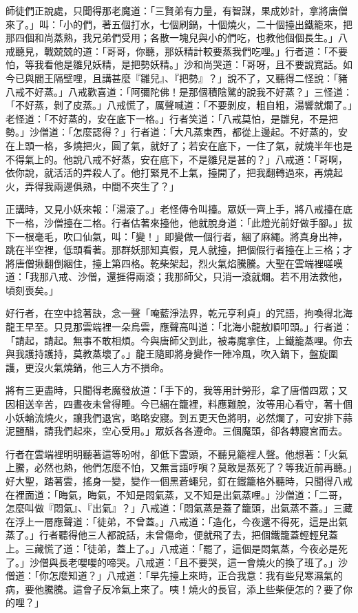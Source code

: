 師徒們正說處，只聞得那老魔道：「三賢弟有力量，有智謀，果成妙計，拿將唐僧來了。」叫：「小的們，著五個打水，七個刷鍋，十個燒火，二十個擡出鐵籠來，把那四個和尚蒸熟，我兄弟們受用；各散一塊兒與小的們吃，也教他個個長生。」八戒聽見，戰兢兢的道：「哥哥，你聽，那妖精計較要蒸我們吃哩。」行者道：「不要怕，等我看他是雛兒妖精，是把勢妖精。」沙和尚哭道：「哥呀，且不要說寬話。如今已與閻王隔壁哩，且講甚麼『雛兒』、『把勢』？」說不了，又聽得二怪說：「豬八戒不好蒸。」八戒歡喜道：「阿彌陀佛！是那個積陰騭的說我不好蒸？」三怪道：「不好蒸，剝了皮蒸。」八戒慌了，厲聲喊道：「不要剝皮，粗自粗，湯響就爛了。」老怪道：「不好蒸的，安在底下一格。」行者笑道：「八戒莫怕，是雛兒，不是把勢。」沙僧道：「怎麼認得？」行者道：「大凡蒸東西，都從上邊起。不好蒸的，安在上頭一格，多燒把火，圓了氣，就好了；若安在底下，一住了氣，就燒半年也是不得氣上的。他說八戒不好蒸，安在底下，不是雛兒是甚的？」八戒道：「哥啊，依你說，就活活的弄殺人了。他打緊見不上氣，擡開了，把我翻轉過來，再燒起火，弄得我兩邊俱熟，中間不夾生了？」

正講時，又見小妖來報：「湯滾了。」老怪傳令叫擡。眾妖一齊上手，將八戒擡在底下一格，沙僧擡在二格。行者估著來擡他，他就脫身道：「此燈光前好做手腳。」拔下一根毫毛，吹口仙氣，叫：「變！」即變做一個行者，綑了麻繩。將真身出神，跳在半空裡，低頭看著。那群妖那知真假，見人就擡，把個假行者擡在上三格；才將唐僧揪翻倒綑住，擡上第四格。乾柴架起，烈火氣焰騰騰。大聖在雲端裡嗟嘆道：「我那八戒、沙僧，還捱得兩滾；我那師父，只消一滾就爛。若不用法救他，頃刻喪矣。」

好行者，在空中捻著訣，念一聲「唵藍淨法界，乾元亨利貞」的咒語，拘喚得北海龍王早至。只見那雲端裡一朵烏雲，應聲高叫道：「北海小龍敖順叩頭。」行者道：「請起，請起。無事不敢相煩。今與唐師父到此，被毒魔拿住，上鐵籠蒸哩。你去與我護持護持，莫教蒸壞了。」龍王隨即將身變作一陣冷風，吹入鍋下，盤旋圍護，更沒火氣燒鍋，他三人方不損命。

將有三更盡時，只聞得老魔發放道：「手下的，我等用計勞形，拿了唐僧四眾；又因相送辛苦，四晝夜未曾得睡。今已綑在籠裡，料應難脫，汝等用心看守，著十個小妖輪流燒火，讓我們退宮，略略安寢。到五更天色將明，必然爛了，可安排下蒜泥鹽醋，請我們起來，空心受用。」眾妖各各遵命。三個魔頭，卻各轉寢宮而去。

行者在雲端裡明明聽著這等吩咐，卻低下雲頭，不聽見籠裡人聲。他想著：「火氣上騰，必然也熱，他們怎麼不怕，又無言語哼嗔？莫敢是蒸死了？等我近前再聽。」好大聖，踏著雲，搖身一變，變作一個黑蒼蠅兒，釘在鐵籠格外聽時，只聞得八戒在裡面道：「晦氣，晦氣，不知是悶氣蒸，又不知是出氣蒸哩。」沙僧道：「二哥，怎麼叫做『悶氣』、『出氣』？」八戒道：「悶氣蒸是蓋了籠頭，出氣蒸不蓋。」三藏在浮上一層應聲道：「徒弟，不曾蓋。」八戒道：「造化，今夜還不得死，這是出氣蒸了。」行者聽得他三人都說話，未曾傷命，便就飛了去，把個鐵籠蓋輕輕兒蓋上。三藏慌了道：「徒弟，蓋上了。」八戒道：「罷了，這個是悶氣蒸，今夜必是死了。」沙僧與長老嚶嚶的啼哭。八戒道：「且不要哭，這一會燒火的換了班了。」沙僧道：「你怎麼知道？」八戒道：「早先擡上來時，正合我意：我有些兒寒濕氣的病，要他騰騰。這會子反冷氣上來了。咦！燒火的長官，添上些柴便怎的？要了你的哩？」

